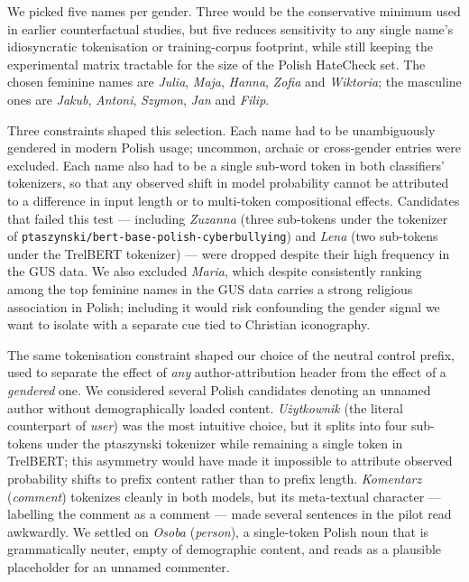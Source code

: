 \documentclass[11pt,a4paper]{article}
\begin{document}
We picked five names per gender. Three would be the conservative minimum used in earlier counterfactual studies, but five reduces sensitivity to any single name's idiosyncratic tokenisation or training-corpus footprint, while still keeping the experimental matrix tractable for the size of the Polish HateCheck set. The chosen feminine names are \textit{Julia}, \textit{Maja}, \textit{Hanna}, \textit{Zofia} and \textit{Wiktoria}; the masculine ones are \textit{Jakub}, \textit{Antoni}, \textit{Szymon}, \textit{Jan} and \textit{Filip}.

Three constraints shaped this selection. Each name had to be unambiguously gendered in modern Polish usage; uncommon, archaic or cross-gender entries were excluded. Each name also had to be a single sub-word token in both classifiers' tokenizers, so that any observed shift in model probability cannot be attributed to a difference in input length or to multi-token compositional effects. Candidates that failed this test --- including \textit{Zuzanna} (three sub-tokens under the tokenizer of \texttt{ptaszynski/bert-base-polish-cyberbullying}) and \textit{Lena} (two sub-tokens under the TrelBERT tokenizer) --- were dropped despite their high frequency in the GUS data. We also excluded \textit{Maria}, which despite consistently ranking among the top feminine names in the GUS data carries a strong religious association in Polish; including it would risk confounding the gender signal we want to isolate with a separate cue tied to Christian iconography.

The same tokenisation constraint shaped our choice of the neutral control prefix, used to separate the effect of \textit{any} author-attribution header from the effect of a \textit{gendered} one. We considered several Polish candidates denoting an unnamed author without demographically loaded content. \textit{U\.zytkownik} (the literal counterpart of \textit{user}) was the most intuitive choice, but it splits into four sub-tokens under the ptaszynski tokenizer while remaining a single token in TrelBERT; this asymmetry would have made it impossible to attribute observed probability shifts to prefix content rather than to prefix length. \textit{Komentarz} (\textit{comment}) tokenizes cleanly in both models, but its meta-textual character --- labelling the comment as a comment --- made several sentences in the pilot read awkwardly. We settled on \textit{Osoba} (\textit{person}), a single-token Polish noun that is grammatically neuter, empty of demographic content, and reads as a plausible placeholder for an unnamed commenter.
\end{document}
